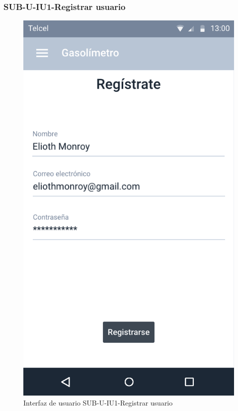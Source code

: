 \subsubsection{SUB-U-IU1-Registrar usuario}\label{SUB-U-IU1}
\begin{figure}[H]
	\centering
	\includegraphics[scale=.55]{Capitulo4/software/submodulos/usuarios/images/sub-u-iu1}
	\caption{Interfaz de usuario SUB-U-IU1-Registrar usuario}
	\label{fig:sub-u-iu1}
\end{figure}